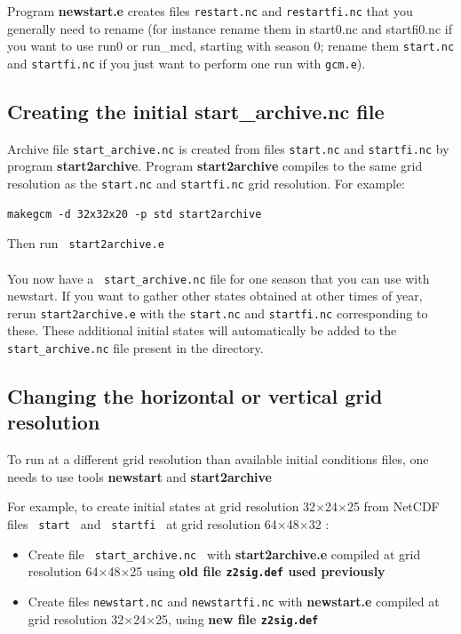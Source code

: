 

Program {\bf newstart.e} creates files
{\tt restart.nc} and {\tt restartfi.nc}
that you generally need to rename (for instance rename them in start0.nc
and startfi0.nc if you want to use run0 or run\_mcd, starting with season 0;
rename them {\tt start.nc} and {\tt startfi.nc} if you just want to perform
one run with {\tt gcm.e}).


\subsection{Creating the initial start\_archive.nc file }

Archive file
{\tt start\_archive.nc} is created from files
{\tt start.nc} and {\tt startfi.nc} by program {\bf start2archive}.
Program {\bf start2archive} compiles to the same grid resolution as the
{\tt start.nc} and {\tt startfi.nc} grid resolution. For example:

\begin{verbatim}
makegcm -d 32x32x20 -p std start2archive
\end{verbatim}
Then run \verb+ start2archive.e+ \\ \\
You now have a \verb+ start_archive.nc+ file for one season that you can
use with newstart.
If you want to gather other states obtained at other times of year, rerun
{\tt start2archive.e} with the {\tt start.nc} and {\tt startfi.nc}
 corresponding to these.
These additional initial states will automatically be added to the
{\tt start\_archive.nc} file present in the directory.

\subsection{Changing the horizontal or vertical grid resolution}

To run at a different grid resolution than available initial conditions
files, one needs to use tools {\bf newstart} and {\bf start2archive}

For example, to create initial states at grid resolution
32$\times$24$\times$25 from NetCDF files
\verb+ start + and \verb+ startfi + at grid resolution
  64$\times$48$\times$32 :

\begin{itemize}
\item Create file \verb+ start_archive.nc +
with {\bf start2archive.e} compiled at grid resolution
64$\times$48$\times$25 using {\bf old file {\tt z2sig.def}
 used previously}

\item Create files
{\tt newstart.nc} and {\tt newstartfi.nc}
 with {\bf newstart.e}
compiled at grid resolution 32$\times$24$\times$25,
using {\bf new file {\tt z2sig.def}}

\end{itemize}

